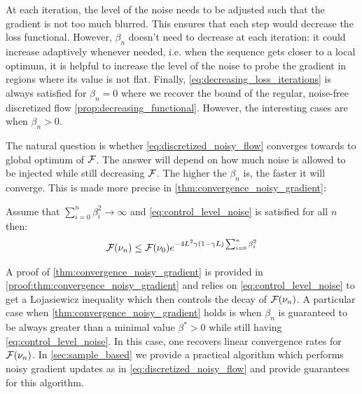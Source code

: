 \begin{remark}
	At each iteration, the level of the noise needs to be adjusted such that the gradient is not too much blurred. This ensures that each step would decrease the loss functional. However, $\beta_n$ doesn't need to decrease at each iteration: it could increase adaptively whenever needed, i.e. when  the sequence gets closer to a local optimum, it is helpful to increase the level of the noise to probe the gradient in regions where its value is not flat.
	Finally, \cref{eq:decreasing_loss_iterations} is always satisfied for $\beta_n = 0$ where we recover the bound of the regular, noise-free discretized flow \cref{prop:decreasing_functional}. However, the interesting cases are when $\beta_n>0$.
 \end{remark}
The natural question is whether \cref{eq:discretized_noisy_flow} converges towards to global optimum of ${{\mathcal F}}$. The answer will depend on how much noise is allowed to be injected while still decreasing ${{\mathcal F}}$. The higher the $\beta_n$ is, the faster it will converge. This is made more precise in \cref{thm:convergence_noisy_gradient}: 
 \begin{theorem}\label{thm:convergence_noisy_gradient}
 Assume that $\sum_{i=0}^n \beta_i^2 \rightarrow \infty $ and \cref{eq:control_level_noise} is satisfied for all $n$ then:
 \begin{align}
 	{{\mathcal F}}(\nu_n)\leq {{\mathcal F}}(\nu_0) e^{-4L^2\gamma(1-\gamma L)\sum_{i=0}^n \beta^2_i}
 \end{align}
 \end{theorem}
 A proof of \cref{thm:convergence_noisy_gradient} is provided in \cref{proof:thm:convergence_noisy_gradient} and relies on \cref{eq:control_level_noise} to get a Lojasiewicz inequality which then controls the decay of ${{\mathcal F}}(\nu_n)$. A particular case when \cref{thm:convergence_noisy_gradient} holds is when $\beta_n$ is guaranteed to be always greater than a minimal value $\beta^*>0$ while still having \cref{eq:control_level_noise}. In this case, one recovers linear convergence rates for ${{\mathcal F}}(\nu_n)$.
In \cref{sec:sample_based} we provide a practical algorithm which performs noisy gradient updates as in \cref{eq:discretized_noisy_flow} and provide guarantees for this algorithm.
 
 
 
